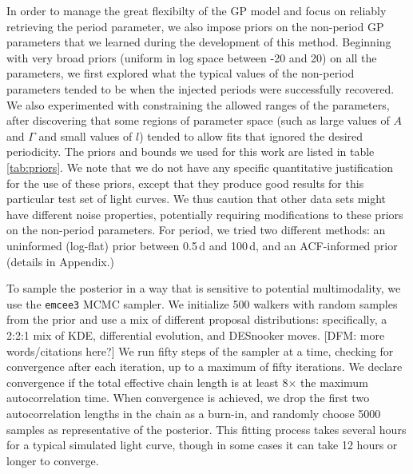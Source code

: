 \documentclass[useAMS, usenatbib, preprint, 12pt]{aastex}
\begin{document}
In order to manage the great flexibilty of the GP model and focus on 
reliably retrieving the period parameter, we also impose priors
on the non-period GP parameters that we
learned during the development of this method.
Beginning with very broad priors (uniform in log space between
-20 and 20) on all the parameters, we first explored what the
typical values of the non-period parameters tended to be when the
injected periods were successfully recovered.  We also experimented with
constraining the allowed ranges of the parameters, after discovering
that some regions of parameter space (such as large values of $A$ and $\Gamma$
and small values of $l$) tended to allow fits that ignored the desired
periodicity.  The priors and bounds we used for this work are listed in
table \ref{tab:priors}.  We note that we do not have any specific
quantitative justification for the use of these priors,
except that they produce good results for this particular test set of
light curves.  We thus caution that other data sets might have different
noise properties, potentially requiring modifications to these priors
on the non-period parameters.  For period, we tried two different methods:
an uninformed (log-flat) prior between 0.5\,d and 100\,d, and an ACF-informed
prior (details in Appendix.)

To sample the posterior in a way that is sensitive to potential
multimodality, we use the \texttt{emcee3} MCMC sampler.
We initialize 500 walkers with random samples from the prior
 and use a mix of different proposal distributions:
specifically, a 2:2:1 mix of KDE, differential evolution, and DESnooker moves.
[DFM: more words/citations here?]
We run fifty steps of the sampler at a time, checking for convergence after
each iteration, up to a maximum of fifty iterations.  We declare convergence if
the total effective chain length is at least 8$\times$ the maximum autocorrelation
time.  When convergence is achieved, we drop the first two autocorrelation 
lengths in the chain as a burn-in, and randomly choose 5000 samples as 
representative of the posterior.  This fitting process takes several hours 
for a typical simulated light curve, though in some cases it can take 12
hours or longer to converge.
\end{document}
